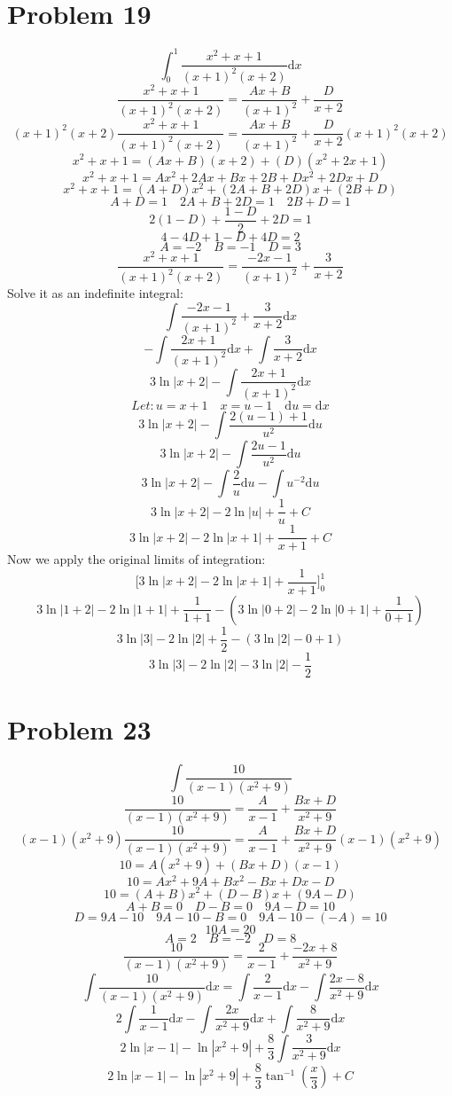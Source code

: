 \documentclass[letterpaper, 12pt]{article}
\renewcommand*{\arctan}{\tan^{-1}}
\newcommand*{\diff}{\mathrm{d}}
\begin{document}
\section*{Problem 19}
\[ \int_{0}^{1}{\frac{x^{2}+x+1}{(x+1)^{2}(x+2)}\diff{x}} \]
\[ \frac{x^{2}+x+1}{(x+1)^{2}(x+2)} = \frac{Ax+B}{(x+1)^{2}}+\frac{D}{x+2} \]
\[ (x+1)^{2}(x+2)\frac{x^{2}+x+1}{(x+1)^{2}(x+2)} =
   \frac{Ax+B}{(x+1)^{2}}+\frac{D}{x+2}(x+1)^{2}(x+2) \]
\[ x^{2}+x+1 = (Ax+B)(x+2)+(D)(x^{2}+2x+1) \]
\[ x^{2}+x+1 = Ax^{2}+2Ax+Bx+2B+Dx^{2}+2Dx+D \]
\[ x^{2}+x+1 = (A+D)x^{2}+(2A+B+2D)x+(2B+D) \]
\[ A+D = 1 \quad 2A+B+2D = 1 \quad 2B+D = 1 \]
\[ 2(1-D)+\frac{1-D}{2}+2D = 1 \]
\[ 4-4D+1-D+4D = 2 \]
\[ A = -2 \quad B = -1 \quad D = 3 \]
\[ \frac{x^{2}+x+1}{(x+1)^{2}(x+2)} = \frac{-2x-1}{(x+1)^{2}}+\frac{3}{x+2} \]
Solve it as an indefinite integral:
\[ \int{\frac{-2x-1}{(x+1)^{2}}+\frac{3}{x+2}\diff{x}} \]
\[ -\int{\frac{2x+1}{(x+1)^{2}}\diff{x}}+\int{\frac{3}{x+2}\diff{x}} \]
\[ 3\ln|x+2|-\int{\frac{2x+1}{(x+1)^{2}}\diff{x}} \]
\[ Let: u = x+1 \quad x = u-1 \quad \diff{u}=\diff{x} \]
\[ 3\ln|x+2|-\int{\frac{2(u-1)+1}{u^{2}}\diff{u}} \]
\[ 3\ln|x+2|-\int{\frac{2u-1}{u^{2}}\diff{u}} \]
\[ 3\ln|x+2|-\int{\frac{2}{u}\diff{u}}-\int{u^{-2}\diff{u}} \]
\[ 3\ln|x+2|-2\ln|u|+\frac{1}{u}+C \]
\[ 3\ln|x+2|-2\ln|x+1|+\frac{1}{x+1}+C \]
Now we apply the original limits of integration:
\[ \bigg[3\ln|x+2|-2\ln|x+1|+\frac{1}{x+1}\bigg]_{0}^{1} \]
\[ 3\ln|1+2|-2\ln|1+1|+\frac{1}{1+1}-(3\ln|0+2|-2\ln|0+1|+\frac{1}{0+1}) \]
\[ 3\ln|3|-2\ln|2|+\frac{1}{2}-(3\ln|2|-0+1) \]
\[ 3\ln|3|-2\ln|2|-3\ln|2|-\frac{1}{2} \]

\section*{Problem 23}
\[ \int{\frac{10}{(x-1)(x^{2}+9)}} \]
\[ \frac{10}{(x-1)(x^{2}+9)} = \frac{A}{x-1}+\frac{Bx+D}{x^{2}+9} \]
\[ (x-1)(x^{2}+9)\frac{10}{(x-1)(x^{2}+9)} =
   \frac{A}{x-1}+\frac{Bx+D}{x^{2}+9}(x-1)(x^{2}+9) \]
\[ 10 = A(x^{2}+9)+(Bx+D)(x-1) \]
\[ 10 = Ax^{2}+9A+Bx^{2}-Bx+Dx-D \]
\[ 10 = (A+B)x^{2}+(D-B)x+(9A-D) \]
\[ A+B = 0 \quad D-B = 0 \quad 9A-D = 10 \]
\[ D = 9A-10 \quad 9A-10-B = 0 \quad 9A-10-(-A) = 10 \]
\[ 10A = 20 \]
\[ A = 2 \quad B = -2 \quad D = 8 \]
\[ \frac{10}{(x-1)(x^{2}+9)} = \frac{2}{x-1}+\frac{-2x+8}{x^{2}+9} \]
\[ \int{\frac{10}{(x-1)(x^{2}+9)}\diff{x}} =
   \int{\frac{2}{x-1}\diff{x}}-\int{\frac{2x-8}{x^{2}+9}\diff{x}} \]
\[ 2\int{\frac{1}{x-1}\diff{x}}-\int{\frac{2x}{x^{2}+9}\diff{x}}+
   \int{\frac{8}{x^{2}+9}\diff{x}} \]
\[ 2\ln|x-1|-\ln|x^{2}+9|+\frac{8}{3}\int{\frac{3}{x^{2}+9}\diff{x}} \]
\[ 2\ln|x-1|-\ln|x^{2}+9|+\frac{8}{3}\arctan(\frac{x}{3})+C \]
\end{document}
